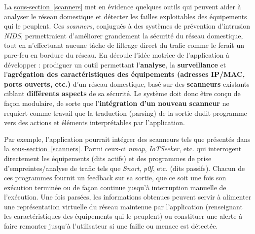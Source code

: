 \documentclass[]{article}
\newcommand{\wordlink}[2]{\hyperref[#1]{#2~\ref{#1}}}
\begin{document}
\par La \wordlink{scanners}{sous-section} met en évidence quelques outils qui peuvent aider à analyser le réseau domestique et détecter les failles exploitables des équipements qui le peuplent. Ces \textit{scanners}, conjugués à des systèmes de prévention d'intrusion \textit{NIDS}, permettraient d'améliorer grandement la sécurité du réseau domestique, tout en n'effectuant aucune tâche de filtrage direct du trafic comme le ferait un pare-feu en bordure du réseau. En découle l'idée motrice de l'application à développer : prodiguer un outil permettant l'\textbf{analyse}, la \textbf{surveillance} et l'\textbf{agrégation des caractéristiques des équipements (adresses IP/MAC, ports ouverts, etc.)} d'un réseau domestique, basé sur des \textbf{scanneurs} existants ciblant \textbf{différents aspects} de sa sécurité. Le système doit donc être conçu de façon modulaire, de sorte que l'\textbf{intégration d'un nouveau scanneur} ne requiert comme travail que la traduction (parsing) de la sortie dudit programme vers des actions et éléments interprétables par l'application.     \\

\par Par exemple, l'application pourrait intégrer des scanneurs tels que présentés dans la \wordlink{scanners}{sous-section}. Parmi ceux-ci \textit{nmap}, \textit{IoTSeeker}, etc. qui interrogent directement les équipements (dits actifs) et des programmes de prise d'empreintes/analyse de trafic tels que \textit{Snort}, \textit{p0f}, etc. (dits passifs). Chacun de ces programmes fournit un feedback sur sa sortie, que ce soit une fois son exécution terminée ou de façon continue jusqu'à interruption manuelle de l'exécution. Une fois parsées, les informations obtenues peuvent servir à alimenter une représentation virtuelle du réseau maintenue par l'application (renseignant les caractéristiques des équipements qui le peuplent) ou constituer une alerte à faire remonter jusqu'à l'utilisateur si une faille ou menace est détectée.\\
\end{document}
